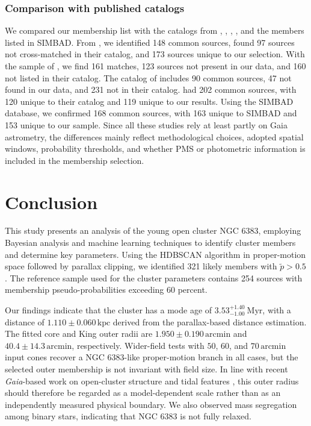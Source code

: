 \documentclass{aa}
\begin{document}
\subsubsection{Comparison with published catalogs}
We compared our membership list with the catalogs from \citet{2020AA...640A...1C}, \citet{2021ApJ...923..129J}, \citet{2022ApJS..262....7H}, \citet{2024arXiv240305143H}, and the members listed in SIMBAD. From \citet{2020AA...640A...1C}, we identified 148 common sources, found 97 sources not cross-matched in their catalog, and 173 sources unique to our selection. With the sample of \citet{2021ApJ...923..129J}, we find 161 matches, 123 sources not present in our data, and 160 not listed in their catalog. The catalog of \citet{2022ApJS..262....7H} includes 90 common sources, 47 not found in our data, and 231 not in their catalog. \citet{2024arXiv240305143H} had 202 common sources, with 120 unique to their catalog and 119 unique to our results. Using the SIMBAD database, we confirmed 168 common sources, with 163 unique to SIMBAD and 153 unique to our sample. Since all these studies rely at least partly on Gaia astrometry, the differences mainly reflect methodological choices, adopted spatial windows, probability thresholds, and whether PMS or photometric information is included in the membership selection.

\section{Conclusion}\label{sec:conclusion}

This study presents an analysis of the young open cluster NGC 6383, employing Bayesian analysis and machine learning techniques to identify cluster members and determine key parameters. Using the HDBSCAN algorithm in proper-motion space followed by parallax clipping, we identified 321 likely members with $\tilde{p}>0.5$. The reference sample used for the cluster parameters contains 254 sources with membership pseudo-probabilities exceeding 60 percent.

Our findings indicate that the cluster has a mode age of $3.53^{+1.40}_{-1.00}~\mathrm{Myr}$, with a distance of $1.110 \pm 0.060\,\mathrm{kpc}$ derived from the parallax-based distance estimation. The fitted core and King outer radii are $1.950 \pm 0.190\,\mathrm{arcmin}$ and $40.4 \pm 14.3\,\mathrm{arcmin}$, respectively. Wider-field tests with $50$, $60$, and $70\,\mathrm{arcmin}$ input cones recover a NGC 6383-like proper-motion branch in all cases, but the selected outer membership is not invariant with field size. In line with recent \textit{Gaia}-based work on open-cluster structure and tidal features \citep{2025MNRAS.539.2513A,2025A&A...694A.258R,2025A&A...698A.156X}, this outer radius should therefore be regarded as a model-dependent scale rather than as an independently measured physical boundary. We also observed mass segregation among binary stars, indicating that NGC 6383 is not fully relaxed.
\end{document}
